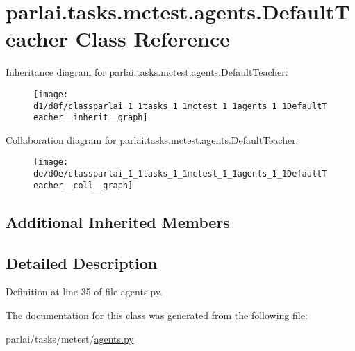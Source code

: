 \hypertarget{classparlai_1_1tasks_1_1mctest_1_1agents_1_1DefaultTeacher}{}\section{parlai.\+tasks.\+mctest.\+agents.\+Default\+Teacher Class Reference}
\label{classparlai_1_1tasks_1_1mctest_1_1agents_1_1DefaultTeacher}


Inheritance diagram for parlai.\+tasks.\+mctest.\+agents.\+Default\+Teacher\+:
\nopagebreak
\begin{figure}[H]
\begin{center}
\leavevmode
\texttt{[image: d1/d8f/classparlai\_1\_1tasks\_1\_1mctest\_1\_1agents\_1\_1DefaultTeacher\_\_inherit\_\_graph]}
\end{center}
\end{figure}


Collaboration diagram for parlai.\+tasks.\+mctest.\+agents.\+Default\+Teacher\+:
\nopagebreak
\begin{figure}[H]
\begin{center}
\leavevmode
\texttt{[image: de/d0e/classparlai\_1\_1tasks\_1\_1mctest\_1\_1agents\_1\_1DefaultTeacher\_\_coll\_\_graph]}
\end{center}
\end{figure}
\subsection*{Additional Inherited Members}


\subsection{Detailed Description}


Definition at line 35 of file agents.\+py.



The documentation for this class was generated from the following file\+:\begin{DoxyCompactItemize}
\item 
parlai/tasks/mctest/\hyperlink{parlai_2tasks_2mctest_2agents_8py}{agents.\+py}\end{DoxyCompactItemize}
